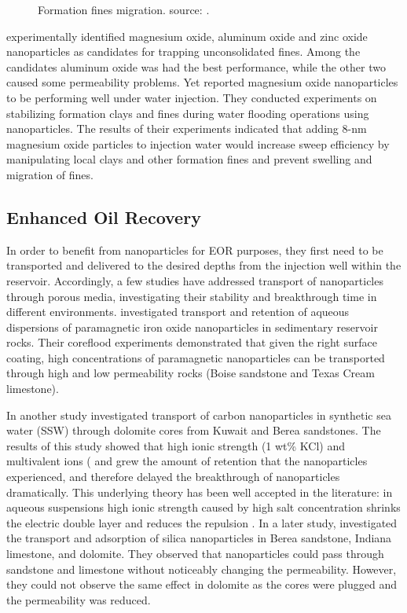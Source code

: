\begin{figure}[p]
    \caption{Formation fines migration. source: \citet{Huang2008}.}
    \label{fig:fines}
\end{figure}

\citet{Ogolo2013} experimentally identified magnesium oxide, aluminum oxide and zinc oxide nanoparticles as candidates for trapping unconsolidated fines. Among the candidates aluminum oxide was had the best performance, while the other two caused some permeability problems. Yet \citet{Huang2015} reported magnesium oxide nanoparticles to be performing well under water injection. They conducted experiments on stabilizing formation clays and fines during water flooding operations using nanoparticles. The results of their experiments indicated that adding 8-nm magnesium oxide particles to injection water would increase sweep efficiency by manipulating local clays and other formation fines and prevent swelling and migration of fines. 

\subsection{Enhanced Oil Recovery}
In order to benefit from nanoparticles for EOR  purposes, they first need to be transported and delivered to the desired depths from the injection well within the reservoir. Accordingly, a few studies have addressed transport of nanoparticles through porous media, investigating their stability and breakthrough time in different environments. \citet{Yu2010} investigated transport and retention  of aqueous dispersions of paramagnetic iron oxide nanoparticles in sedimentary reservoir rocks. Their coreflood experiments demonstrated that given the right surface coating, high concentrations of paramagnetic nanoparticles can be transported through high and low permeability rocks (Boise sandstone and Texas Cream limestone). 

In another study \citet{Yu2010a} investigated transport of carbon nanoparticles in synthetic sea water (SSW) through dolomite cores from Kuwait and Berea sandstones. The results of this study showed that high ionic strength (1 wt\% KCl) and multivalent ions ( and  grew the amount of retention that the nanoparticles experienced, and therefore delayed the breakthrough of nanoparticles dramatically. This underlying theory has been well accepted in the literature: in aqueous suspensions high ionic strength caused by high salt concentration shrinks the electric double layer  and reduces the repulsion \citep{Goodwin2009, Tadros2013}. In a later study, \citet{Yu2012}investigated the transport and adsorption of silica nanoparticles in Berea sandstone, Indiana limestone, and dolomite. They observed that nanoparticles could pass through sandstone and limestone without noticeably changing the permeability. However, they could not observe the same effect in dolomite as the cores were plugged and the permeability was reduced. 

